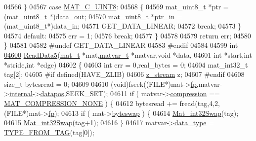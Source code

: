\begin{DoxyCode}
{{{{{{{{{{{{{{{{{{{{{{{{{04566         \}
04567         \textcolor{keywordflow}{case} \hyperlink{group___m_a_t_ggad4d60ae7b709fc81bfd744fb4c857c40a81270f8093cb4808e992c1d29d84d4e3}{MAT\_C\_UINT8}:
04568         \{
04569             mat\_uint8\_t *ptr = (mat\_uint8\_t *)data\_out;
04570             mat\_uint8\_t *ptr\_in = (mat\_uint8\_t*)data\_in;
04571             GET\_DATA\_LINEAR;
04572             \textcolor{keywordflow}{break};
04573         \}
04574         \textcolor{keywordflow}{default}:
04575             err = 1;
04576             \textcolor{keywordflow}{break};
04577     \}
04578 
04579     \textcolor{keywordflow}{return} err;
04580 \}
04581 
04582 \textcolor{preprocessor}{#undef GET\_DATA\_LINEAR}
04583 \textcolor{preprocessor}{#endif}
04584 
04599 \textcolor{keywordtype}{int}
\hyperlink{mat5_8c_af8a259573b7b3a89555c5a9bc1860e19}{04600} \hyperlink{mat5_8c_af8a259573b7b3a89555c5a9bc1860e19}{ReadData5}(\hyperlink{struct__mat__t}{mat\_t} *mat,\hyperlink{group___m_a_t_structmatvar__t}{matvar\_t} *matvar,\textcolor{keywordtype}{void} *data,
04601     \textcolor{keywordtype}{int} *start,\textcolor{keywordtype}{int} *stride,\textcolor{keywordtype}{int} *edge)
04602 \{
04603     \textcolor{keywordtype}{int} err = 0,real\_bytes = 0;
04604     mat\_int32\_t tag[2];
04605 \textcolor{preprocessor}{#if defined(HAVE\_ZLIB)}
04606     \hyperlink{structz__stream__s}{z\_stream} z;
04607 \textcolor{preprocessor}{#endif}
04608     \textcolor{keywordtype}{size\_t} bytesread = 0;
04609 
04610     (void)fseek((FILE*)mat->\hyperlink{struct__mat__t_a85f562e407ca9ad4d2a6e14f839432b7}{fp},matvar->\hyperlink{group___m_a_t_a6e97e3ed9f40c49322c18561c2a94e92}{internal}->\hyperlink{structmatvar__internal_afd3bfaab126a160bd6855563e1ea0a7e}{datapos},SEEK\_SET);
04611     \textcolor{keywordflow}{if} ( matvar->\hyperlink{group___m_a_t_aeef0466048621cb2c959ba7f6c774d06}{compression} == \hyperlink{group___m_a_t_gga768c318af97bd2567758ecb001ceb7f4a2280b97631ff5dd24dec55261dc587b6}{MAT\_COMPRESSION\_NONE} ) \{
04612         bytesread += fread(tag,4,2,(FILE*)mat->\hyperlink{struct__mat__t_a85f562e407ca9ad4d2a6e14f839432b7}{fp});
04613         \textcolor{keywordflow}{if} ( mat->\hyperlink{struct__mat__t_a99d207977af5e04941ace56d71817a40}{byteswap} ) \{
04614             \hyperlink{endian_8c_a2e0153996243f0a34df9a5286087cfa3}{Mat\_int32Swap}(tag);
04615             \hyperlink{endian_8c_a2e0153996243f0a34df9a5286087cfa3}{Mat\_int32Swap}(tag+1);
04616         \}
04617         matvar->\hyperlink{group___m_a_t_ab6aafe9bd77f0f077852593dec438144}{data\_type} = \hyperlink{mat5_8c_a82bacecc4afc633b61bc3dc8ef88d1ed}{TYPE\_FROM\_TAG}(tag[0]);
}}}}}}}}}}}}}}}}}}}}}}}}}
\end{DoxyCode}
